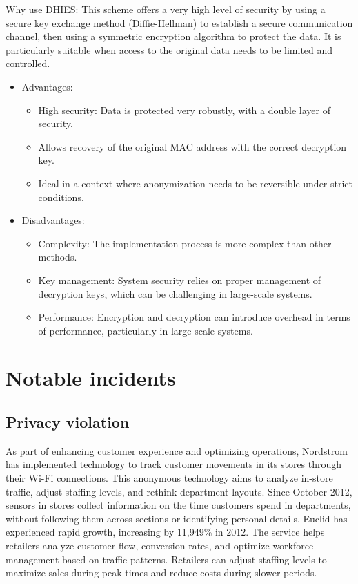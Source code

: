 \documentclass[aps,prb,twocolumn,superscriptaddress,floatfix,longbibliography,nofootinbib]{revtex4-2}
\begin{document}
  Why use DHIES: This scheme offers a very high level of security by using a secure key exchange method
  (Diffie-Hellman) to establish a secure communication channel, then using a symmetric encryption algorithm
  to protect the data. It is particularly suitable when access to the original data needs to be 
  limited and controlled.

  \begin{itemize}
    \item Advantages:
      \begin{itemize}
      \item High security: Data is protected very robustly, with a double layer of security.
      \item Allows recovery of the original MAC address with the correct decryption key.
      \item Ideal in a context where anonymization needs to be reversible under strict conditions.
      \end{itemize}
    \item Disadvantages:
      \begin{itemize}
      \item Complexity: The implementation process is more complex than other methods.
      \item Key management: System security relies on proper management of decryption keys, 
      which can be challenging in large-scale systems.
      \item Performance: Encryption and decryption can introduce overhead in terms of performance, 
      particularly in large-scale systems.
      \end{itemize}
  \end{itemize}


\section{\label{sec:Notable incidents}Notable incidents}
  \subsection{\label{subsec:Nordstrom}Privacy violation}
  As part of enhancing customer experience and optimizing operations, Nordstrom has 
  implemented technology to track customer movements in its stores through their 
  Wi-Fi connections. This anonymous technology aims to analyze in-store traffic, 
  adjust staffing levels, and rethink department layouts. Since October 2012, 
  sensors in stores collect information on the time customers spend in departments, 
  without following them across sections or identifying personal details.
  Euclid has experienced rapid growth, increasing by 11,949\% in 2012. 
  The service helps retailers analyze customer flow, conversion rates, and 
  optimize workforce management based on traffic patterns. Retailers can adjust 
  staffing levels to maximize sales during peak times and reduce costs during slower periods.
\end{document}
